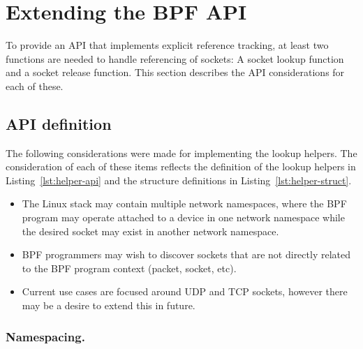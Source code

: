 \documentclass[10pt,sigconf,authorversion]{lpc}
\newcommand\linuxversion{{v4.20}}
\begin{document}
\section{Extending the BPF API}

To provide an API that implements explicit reference tracking, at least two
functions are needed to handle referencing of sockets: A socket lookup function
and a socket release function. This section describes the API considerations
for each of these.

\subsection{API definition}

The following considerations were made for implementing the lookup helpers. The
consideration of each of these items reflects the definition of the lookup
helpers in Listing~\ref{lst:helper-api} and the structure definitions in
Listing~\ref{lst:helper-struct}.

\begin{itemize}
    \item The Linux stack may contain multiple network namespaces, where the
          BPF program may operate attached to a device in one network namespace
          while the desired socket may exist in another network namespace.
    \item BPF programmers may wish to discover sockets that are not directly
          related to the BPF program context (packet, socket, etc).
    \item Current use cases are focused around UDP and TCP sockets, however
          there may be a desire to extend this in future.
\end{itemize}





\subsubsection{Namespacing.}
\end{document}
